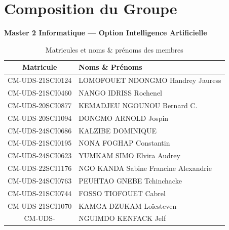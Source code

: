 \thispagestyle{empty}
\chapter*{Composition du Groupe}

\begin{center}
\textbf{\large Master 2 Informatique --- Option Intelligence Artificielle}\\[0.5cm]
\end{center}

\renewcommand{\arraystretch}{1.5}
\begin{table}[H]
\centering
\caption*{Matricules et noms \& prénoms des membres}
\begin{tabularx}{\textwidth}{|c|X|}
\hline
\rowcolor{maingreen!20}\textbf{Matricule} & \textbf{Noms \& Prénoms} \\
\hline
CM-UDS-21SCI0124 & LOMOFOUET NDONGMO Handrey Jauress \\
\hline
CM-UDS-21SCI0460 & NANGO IDRISS Rochenel \\
\hline
CM-UDS-20SCI0877 & KEMADJEU NGOUNOU Bernard C. \\
\hline
CM-UDS-20SCI1094 & DONGMO ARNOLD Jospin \\
\hline
CM-UDS-24SCI0686 & KALZIBE DOMINIQUE \\
\hline
CM-UDS-21SCI0195 & NONA FOGHAP Constantin \\
\hline
CM-UDS-24SCI0623 & YUMKAM SIMO Elvira Audrey \\
\hline
CM-UDS-22SCI1176 & NGO KANDA Sabine Francine Alexandrie \\
\hline
CM-UDS-24SCI0763 & PEUHTAO GNEBE Tchinchacke \\
\hline
CM-UDS-21SCI0744 & FOSSO TIOFOUET Cabrel \\
\hline
CM-UDS-21SCI1070 & KAMGA DZUKAM Loïcsteven \\
\hline
CM-UDS-\phantom{00000000} & NGUIMDO KENFACK Jelf \\
\hline
\end{tabularx}
\end{table}

\newpage
